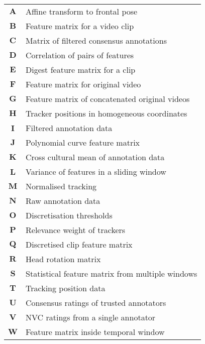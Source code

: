 \documentclass[11pt]{book}  %
\def\approxaffine{\textbf{A}} %
\def\clipFeature{\textbf{B}}
\def\clipConcensus{\textbf{C}} %
\def\dyadicCorrelation{\textbf{D}}
\def\clipFeatureDigest{\textbf{E}}
\def\frameFeatureMatrix{\textbf{F}}
\def\globalFeature{\textbf{G}}
\def\headMeshPos{\textbf{H}} %
\def\filteredAnnotation{\textbf{I}}
\def\temporalWindowFeature{\textbf{J}} %
\def\globalAnnotation{\textbf{K}}
\def\slidingWindowVar{\textbf{L}} %
\def\normalisedTracking{\textbf{M}} %
\def\rawAnnotation{\textbf{N}} %
\def\thresholdVal{\textbf{O}} %
\def\trackerWeight{\textbf{P}}
\def\discretisedFeatures{\textbf{Q}}
\def\headRotation{\textbf{R}} %
\def\temporalFeature{\textbf{S}} %
\def\rawTracking{\textbf{T}} %
\def\robustAnnotation{\textbf{U}}
\def\singleAnnotatorRatings{\textbf{V}} %
\def\temporalWindow{\textbf{W}} %
\def\temporalFeatSingleStart{Statistical feature}
\begin{document}
\begin{center}
\begin{tabular*}{0.75\textwidth}{  c | l  }
$\approxaffine$		& Affine transform to frontal pose\\
$\clipFeature$		& Feature matrix for a video clip\\
$\clipConcensus$	& Matrix of filtered consensus annotations\\
$\dyadicCorrelation$	& Correlation of pairs of features\\
$\clipFeatureDigest$	& Digest feature matrix for a clip\\
$\frameFeatureMatrix$	& Feature matrix for original video \\
$\globalFeature$	& Feature matrix of concatenated original videos\\
$\headMeshPos$		& Tracker positions in homogeneous coordinates\\
$\filteredAnnotation$	& Filtered annotation data \\
$\temporalWindowFeature$& Polynomial curve feature matrix\\
$\globalAnnotation$	& Cross cultural mean of annotation data \\
$\slidingWindowVar$	& Variance of features in a sliding window \\
$\normalisedTracking$	& Normalised tracking \\
$\rawAnnotation$	& Raw annotation data\\
$\thresholdVal$		& Discretisation thresholds\\
$\trackerWeight$	& Relevance weight of trackers\\
$\discretisedFeatures$	& Discretised clip feature matrix \\
$\headRotation$		& Head rotation matrix\\
$\temporalFeature$	& \temporalFeatSingleStart{ }matrix from multiple windows \\
$\rawTracking$		& Tracking position data \\
$\robustAnnotation$	& Consensus ratings of trusted annotators\\
$\singleAnnotatorRatings$ & \ac{NVC} ratings from a single annotator\\
$\temporalWindow$	& Feature matrix inside temporal window\\
\end{tabular*}


\end{center}
\end{document}
